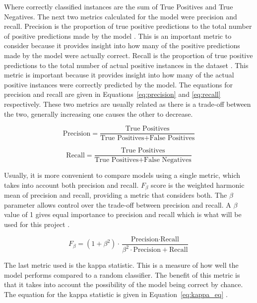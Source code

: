 Where correctly classified instances are the sum of True Positives and True Negatives. The next two metrics calculated for the model were precision and recall. Precision is the proportion of true positive predictions to the total number of positive predictions made by the model \cite{sokolovaSystematicAnalysisPerformance2009}. This is an important metric to consider because it provides insight into how many of the positive predictions made by the model were actually correct. Recall is the proportion of true positive predictions to the total number of actual positive instances in the dataset \cite{sokolovaSystematicAnalysisPerformance2009}. This metric is important because it provides insight into how many of the actual positive instances were correctly predicted by the model. The equations for precision and recall are given in Equations~\ref{eq:precision} and \ref{eq:recall} respectively. These two metrics are usually related as there is a trade-off between the two, generally increasing one causes the other to decrease.

\begin{equation}
    \label{eq:precision}
    \text{Precision} = \frac{\text{True Positives}}{\text{True Positives} + \text{False Positives}}
\end{equation}


\begin{equation}
    \label{eq:recall}
    \text{Recall} = \frac{\text{True Positives}}{\text{True Positives} + \text{False Negatives}}
\end{equation}


Usually, it is more convenient to compare models using a single metric, which takes into account both precision and recall. $F_{\beta}$ score is the weighted harmonic mean of precision and recall, providing a metric that considers both. The $\beta$ parameter allows control over the trade-off between precision and recall.  A $\beta$ value of 1 gives equal importance to precision and recall which is what will be used for this project \cite{sokolovaSystematicAnalysisPerformance2009}. 

\begin{equation}
    \label{eq:f1}
    F_{\beta} = (1 + \beta^2) \cdot \frac{\text{Precision} \cdot \text{Recall}}{\beta^2 \cdot \text{Precision} + \text{Recall}}
\end{equation}

The last metric used is the kappa statistic. This is a measure of how well the model performs compared to a random classifier. The benefit of this metric is that it takes into account the possibility of the model being correct by chance. The equation for the kappa statistic is given in Equation~\ref{eq:kappa_eq} \cite{mchughInterraterReliabilityKappa2012}.

